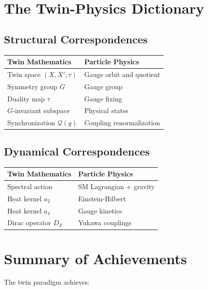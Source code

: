 \documentclass[11pt,a4paper,openright]{book}
\theoremstyle{plain}
\theoremstyle{definition}
\begin{document}
\section{The Twin-Physics Dictionary}

\subsection{Structural Correspondences}

\begin{center}
\begin{tabular}{ll}
\toprule
\textbf{Twin Mathematics} & \textbf{Particle Physics} \\
\midrule
Twin space $(X, X', \tau)$ & Gauge orbit and quotient \\
Symmetry group $G$ & Gauge group \\
Duality map $\tau$ & Gauge fixing \\
$G$-invariant subspace & Physical states \\
Synchronization $\mathcal{Q}(g)$ & Coupling renormalization \\
\bottomrule
\end{tabular}
\end{center}

\subsection{Dynamical Correspondences}

\begin{center}
\begin{tabular}{ll}
\toprule
\textbf{Twin Mathematics} & \textbf{Particle Physics} \\
\midrule
Spectral action & SM Lagrangian + gravity \\
Heat kernel $a_2$ & Einstein-Hilbert \\
Heat kernel $a_4$ & Gauge kinetics \\
Dirac operator $D_F$ & Yukawa couplings \\
\bottomrule
\end{tabular}
\end{center}

\section{Summary of Achievements}

The twin paradigm achieves:
\end{document}
